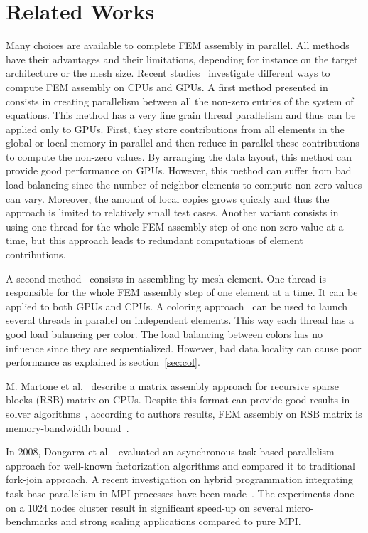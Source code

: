 \documentclass{IOS-Book-Article}
\begin{document}
\section{Related Works}
Many choices are available to complete FEM assembly in parallel.
All methods have their advantages and their limitations, depending for instance on the target architecture or the mesh size.
Recent studies~\cite{cecka2011assembly,CPUGPUasm} investigate different ways to compute FEM assembly on CPUs and GPUs.
A first method presented in~\cite{cecka2011assembly} consists in creating parallelism between all the non-zero entries of the system of equations.
This method has a very fine grain thread parallelism and thus can be applied only to GPUs.
First, they store contributions from all elements in the global or local memory in parallel and then reduce in parallel these contributions to compute the non-zero values.
By arranging the data layout, this method can provide good performance on GPUs.
However, this method can suffer from bad load balancing since the number of neighbor elements to compute non-zero values can vary.
Moreover, the amount of local copies grows quickly and thus the approach is limited to relatively small test cases.
Another variant consists in using one thread for the whole FEM assembly step of one non-zero value at a time, but this approach leads to redundant computations of element contributions.

A second method~\cite{cecka2011assembly} consists in assembling by mesh element. One thread is responsible for the whole FEM assembly step of one element at a time.
It can be applied to both GPUs and CPUs.
A coloring approach~\cite{CUDAfe,CPUfe} can be used to launch several threads in parallel on independent elements.
This way each thread has a good load balancing per color. The load balancing between colors has no influence since they are sequentialized.
However, bad data locality can cause poor performance as explained is section~\ref{sec:col}.

M. Martone et al.~\cite{RSBasm} describe a matrix assembly approach for recursive sparse blocks (RSB) matrix on CPUs.
Despite this format can provide good results in solver algorithms~\cite{RSBsolver}, according to authors results, FEM assembly on RSB matrix is memory-bandwidth bound~\cite{RSBasm}.

In 2008, Dongarra et al.~\cite{Dongarra} evaluated an asynchronous task based parallelism approach for well-known factorization algorithms and compared it to traditional fork-join approach.
A recent investigation on hybrid programmation integrating task base parallelism in MPI processes have been made~\cite{MPIhybid}.
The experiments done on a 1024 nodes cluster result in significant speed-up on several micro-benchmarks and strong scaling applications compared to pure MPI.
\end{document}
